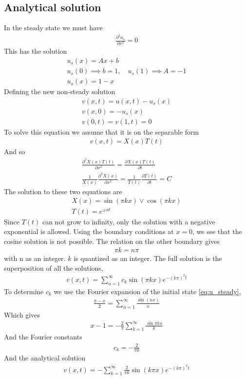 \documentclass[11pt,a4paper,final]{article}
\numberwithin{equation}{section}
\begin{document}
\subsection{Analytical solution}
In the steady state we must have
\begin{gather}
\frac{\partial^2 u_s}{\partial x^2} = 0
\end{gather}
This has the solution
\begin{gather}
u_s(x) = Ax + b\\
u_s(0) \implies b = 1, \quad
u_s(1) \implies A = -1\\
u_s(x) = 1-x \label{eq:u_steady}
\end{gather}
Defining the new non-steady solution
\begin{gather}
v(x,t) = u(x,t) - u_s(x)\\
v(x,0) = -u_s(x)\\
v(0,t) = v(1, t) = 0
\end{gather}
To solve this equation we assume that it is on the separable form
\begin{gather}
v(x,t) = X(x)T(t)
\end{gather}
And so
\begin{gather}
\frac{\partial^2 X(x)T(t)}{\partial x^2}
= \frac{\partial X(x)T(t)}{\partial t}\\
\frac{1}{X(x)}\frac{\partial^2 X(x)}{\partial x^2}
 = \frac{1}{T(t)}\frac{\partial T(t)}{\partial t} = C
 \label{eq:coupled_constant}
\end{gather}
The solution to these two equations are 
\begin{gather}
X(x) = \sin(\pi kx) \lor \cos(\pi kx)\\
T(t) = e^{\pm at}
\end{gather}
Since $T(t)$ can not grow to infinity, only the solution with a 
negative exponential is allowed. Using the boundary conditions at 
$x=0$, we see that the cosine solution is not possible.
The relation on the other boundary gives 
\begin{gather}
\pi k = n\pi
\end{gather}
with n as an integer. $k$ is quantized as an integer. The full solution 
is the superposition of all the solutions,
\begin{gather}
v(x,t) = \sum_{n=1}^\infty c_k \sin(\pi kx)e^{-(k\pi)^2t}
\end{gather}
To determine $c_k$ we use the Fourier expansion of the initial 
state \eqref{eq:u_steady}, 
\begin{gather}
\frac{\pi - x}{2} = \sum_{n=1}^\infty \frac{\sin(nx)}{n}
\end{gather}
Which gives
\begin{gather}
x-1 = -\frac{2}{\pi}\sum_{k=1}^\infty \frac{\sin\pi kx}{k}
\end{gather}
And the Fourier constants
\begin{gather}
c_k = -\frac{2}{\pi k}
\end{gather}
And the analytical solution
\begin{gather}
v(x,t) = -\sum_{k=1}^\infty \frac{2}{\pi k}\sin(k\pi x)e^{-(k\pi)^2t}
\end{gather}
\end{document}
